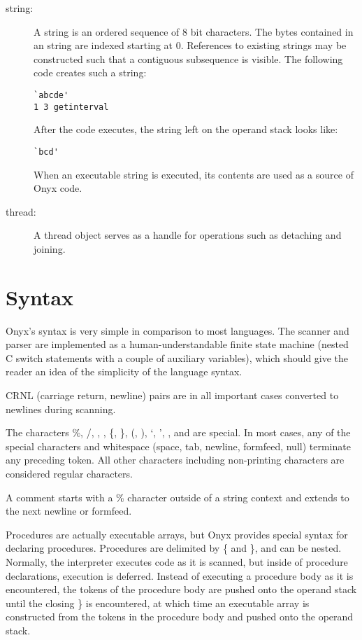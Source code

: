 \begin{description}
\item[string: ] A string is an ordered sequence of 8 bit characters.  The bytes
contained in an string are indexed starting at 0.  References to existing
strings may be constructed such that a contiguous subsequence is visible.  The
following code creates such a string:

\begin{verbatim}
`abcde'
1 3 getinterval
\end{verbatim}

After the code executes, the string left on the operand stack looks like:

\begin{verbatim}
`bcd'
\end{verbatim}

When an executable string is executed, its contents are used as a source of Onyx
code.

\item[thread: ] A thread object serves as a handle for operations such as
detaching and joining.

\end{description}

\section{Syntax}
\label{sec:onyx_syntax}
Onyx's syntax is very simple in comparison to most languages.  The scanner and
parser are implemented as a human-understandable finite state machine (nested C
switch statements with a couple of auxiliary variables), which should give the
reader an idea of the simplicity of the language syntax.

CRNL (carriage return, newline) pairs are in all important cases converted to
newlines during scanning.

The characters \%, /, {\lb}, {\rb}, \{, \}, (, ), `, ', {\lt}, and {\gt} are
special.  In most cases, any of the special characters and whitespace (space,
tab, newline, formfeed, null) terminate any preceding token.  All other
characters including non-printing characters are considered regular characters.

A comment starts with a \% character outside of a string context and extends to
the next newline or formfeed.

Procedures are actually executable arrays, but Onyx provides special syntax for
declaring procedures.  Procedures are delimited by \{ and \}, and can be
nested.  Normally, the interpreter executes code as it is scanned, but inside of
procedure declarations, execution is deferred.  Instead of executing a procedure
body as it is encountered, the tokens of the procedure body are pushed onto the
operand stack until the closing \} is encountered, at which time an executable
array is constructed from the tokens in the procedure body and pushed onto the
operand stack.

